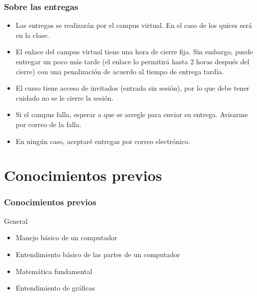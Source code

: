 \documentclass{beamer}
\begin{document}
	\begin{frame}
		\frametitle{Sobre las entregas}
		\begin{itemize}
			\item Las entregas se realizarán por el campus virtual. En el caso de los quices será en la clase.
			\item El enlace del campus virtual tiene una hora de cierre fija. Sin embargo, puede entregar un poco más tarde (el enlace lo permitirá hasta 2 horas después del cierre) con una penalización de acuerdo al tiempo de entrega tardía.
			\item El curso tiene acceso de invitados (entrada sin sesión), por lo que debe tener cuidado no se le cierre la sesión.
			\item Si el campus falla, esperar a que se arregle para enviar su entrega. Avisarme por correo de la falla.
			\item En ningún caso, aceptaré entregas por correo electrónico.
		\end{itemize}
	\end{frame}	

	\section{Conocimientos previos}	

	\begin{frame}
		\frametitle{Conocimientos previos}
		\begin{block}{General}
			\begin{itemize}
				\item Manejo básico de un computador
				\item Entendimiento básico de las partes de un computador
				\item Matemática fundamental
				\item Entendimiento de gráficas
			\end{itemize}
		\end{block}
	\end{frame}	
		
		
\end{document}
